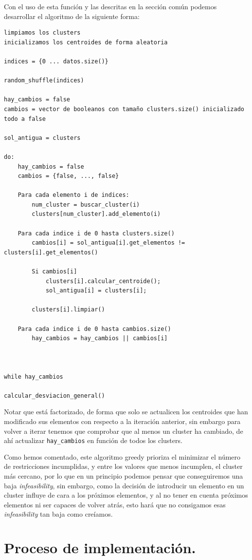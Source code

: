 \documentclass[12pt, spanish]{article}
\begin{document}
Con el uso de esta función y las descritas en la sección común podemos desarrollar el algoritmo de la siguiente forma:

\begin{lstlisting}
limpiamos los clusters
inicializamos los centroides de forma aleatoria

indices = {0 ... datos.size()}

random_shuffle(indices)

hay_cambios = false
cambios = vector de booleanos con tamaño clusters.size() inicializado todo a false

sol_antigua = clusters

do:
	hay_cambios = false
	cambios = {false, ..., false}
	
	Para cada elemento i de indices:
		num_cluster = buscar_cluster(i)
		clusters[num_cluster].add_elemento(i)
		
	Para cada indice i de 0 hasta clusters.size()
		cambios[i] = sol_antigua[i].get_elementos != clusters[i].get_elementos()
		
		Si cambios[i]
			clusters[i].calcular_centroide();
			sol_antigua[i] = clusters[i];
			
		clusters[i].limpiar()
		
	Para cada indice i de 0 hasta cambios.size()
		hay_cambios = hay_cambios || cambios[i]



while hay_cambios

calcular_desviacion_general()
\end{lstlisting}

Notar que está factorizado, de forma que solo se actualicen los centroides que han modificado sus elementos con respecto a la iteración anterior, sin embargo para volver a iterar tenemos que comprobar que al menos un cluster ha cambiado, de ahí actualizar \texttt{hay\_cambios} en función de todos los clusters.

Como hemos comentado, este algoritmo greedy prioriza el minimizar el número de restricciones incumplidas, y entre los valores que menos incumplen, el cluster más cercano, por lo que en un principio podemos pensar que conseguiremos una baja \textit{infeasibility}, sin embargo, como la decisión de introducir un elemento en un cluster influye de cara a los próximos elementos, y al no tener en cuenta próximos elementos ni ser capaces de volver atrás, esto hará que no consigamos esas \textit{infeasibility} tan baja como creíamos.

\section{Proceso de implementación.}
\end{document}
